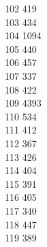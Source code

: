 { 102	419 \\
 103	434 \\
 104	1094 \\
 105	440 \\
 106	457 \\
 107	337 \\
 108	422 \\
 109	4393 \\
 110	534 \\
 111	412 \\
 112	367 \\
 113	426 \\
 114	404 \\
 115	391 \\
 116	405 \\
 117	340 \\
 118	447 \\
 119	389 \\
}
